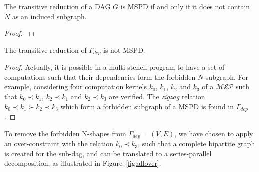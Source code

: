 \begin{myth}
The transitive reduction of a DAG $G$ is MSPD if and only if it does not contain $N$ as an induced subgraph.
\end{myth}

\begin{proof} \cite{Valdes:1979:RSP:800135.804393} \end{proof}

\begin{myprop}
The transitive reduction of $\Gamma_{dep}$ is not MSPD.
\end{myprop}

\begin{proof}
Actually, it is possible in a multi-stencil program to have a set of computations such that their dependencies form the forbidden $N$ subgraph. For example, considering four computation kernels $k_0$, $k_1$, $k_2$ and $k_3$ of a $\mathcal{MSP}$ such that $k_0 \prec k_1$, $k_2 \prec k_1$ and $k_2 \prec k_3$ are verified. The \emph{zigzag} relation $k_0 \prec k_1 \succ k_2 \prec k_3$ which form a forbidden subgraph of a MSPD is found in $\Gamma_{dep}$.
\end{proof}

To remove the forbidden N-shapes from $\Gamma_{dep}=(V,E)$, we have chosen to apply an over-constraint with the relation $k_0 \prec k_3$, such that a complete bipartite graph is created for the sub-dag, and can be translated to a series-parallel decomposition, as illustrated in Figure~\ref{fig:allover}. 

